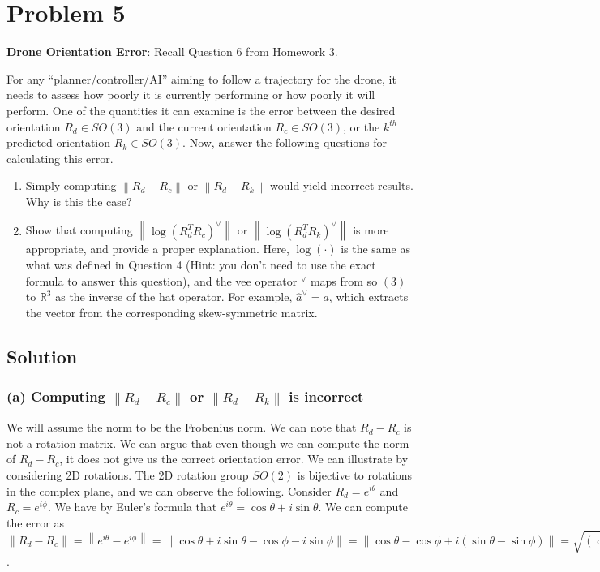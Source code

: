 \section*{Problem 5}

\textbf{Drone Orientation Error}:
Recall Question 6 from Homework 3.

For any ``planner/controller/AI'' aiming to follow a trajectory for the drone, it needs to assess how poorly it is currently performing or how poorly it will perform.
One of the quantities it can examine is the error between the desired orientation \( R_{d} \in SO(3) \) and the current orientation \( R_{c} \in SO(3) \), or the \( k^{th} \) predicted orientation \( R_{k} \in SO(3) \).
Now, answer the following questions for calculating this error.
\begin{enumerate}[label= (\alph*)]
      \item Simply computing \( \left \| R_{d}-R_{c}\right \| \) or \( \left \| R_{d}-R_{k}\right \| \) would yield incorrect results.
            Why is this the case?
      \item  Show that computing \( \left \| \log {\left(R_{d}^{T} R_{c}\right)}^{\vee}\right \| \) or \( \left \| \log {\left(R_{d}^{T} R_{k}\right)}^{\vee}\right \| \) is more appropriate, and provide a proper explanation.
            Here, \( \log (\cdot) \) is the same as what was defined in Question 4 (Hint: you don't need to use the exact formula to answer this question), and the vee operator \( { }^{\vee} \) maps from so \( (3) \) to \( \mathbb{R}^{3} \) as the inverse of the hat operator.
            For example, \( \hat{a}^{\vee}=a \), which extracts the vector from the corresponding skew-symmetric matrix.
\end{enumerate}

\subsection*{Solution}

\subsubsection*{(a) Computing \( \left \| R_{d}-R_{c}\right \| \) or \( \left \| R_{d}-R_{k}\right \| \) is incorrect}

We will assume the norm to be the Frobenius norm.
We can note that \( R_{d} - R_{c} \) is not a rotation matrix.
We can argue that even though we can compute the norm of \( R_{d} - R_{c} \), it does not give us the correct orientation error.
We can illustrate by considering 2D rotations.
The 2D rotation group \( SO(2) \) is bijective to rotations in the complex plane, and we can observe the following.
Consider \( R_d = e^{i \theta} \) and \( R_c = e^{i \phi} \).
We have by Euler's formula that \( e^{i \theta} = \cos \theta + i \sin \theta \).
We can compute the error as \( \left \| R_d - R_c \right \| = \left \| e^{i \theta} - e^{i \phi} \right \| = \left \| \cos \theta + i \sin \theta - \cos \phi - i \sin \phi \right \| = \left \| \cos \theta - \cos \phi + i (\sin \theta - \sin \phi) \right \| = \sqrt{(\cos \theta - \cos \phi)^2 + (\sin \theta - \sin \phi)^2} = \sqrt{2 - 2 \cos (\theta - \phi)} \neq \left \| \theta - \phi \right \| \).

